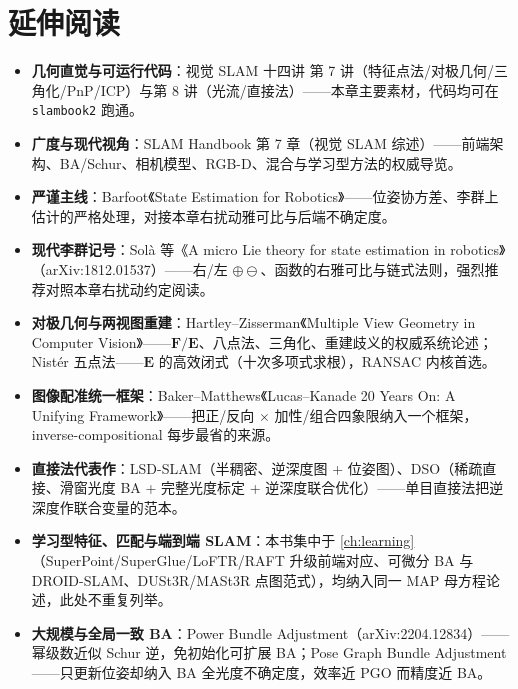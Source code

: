 \section*{延伸阅读}
\begin{itemize}
  \item \textbf{几何直觉与可运行代码}：视觉 SLAM 十四讲\cite{gaoxiang2019slam14} 第 7 讲（特征点法/对极几何/三角化/PnP/ICP）与第 8 讲（光流/直接法）——本章主要素材，代码均可在 \texttt{slambook2} 跑通。
  \item \textbf{广度与现代视角}：SLAM Handbook\cite{carlone2026handbook} 第 7 章（视觉 SLAM 综述）——前端架构、BA/Schur、相机模型、RGB-D、混合与学习型方法的权威导览。
  \item \textbf{严谨主线}：Barfoot《State Estimation for Robotics》\cite{barfoot2024state}——位姿协方差、李群上估计的严格处理，对接本章右扰动雅可比与后端不确定度。
  \item \textbf{现代李群记号}：Solà 等《A micro Lie theory for state estimation in robotics》\cite{sola2018micro}（arXiv:1812.01537）——右/左 $\oplus\ominus$、函数的右雅可比与链式法则，强烈推荐对照本章右扰动约定阅读。
  \item \textbf{对极几何与两视图重建}：Hartley--Zisserman《Multiple View Geometry in Computer Vision》\cite{hartley2004multiview}——$\mathbf{F}/\mathbf{E}$、八点法、三角化、重建歧义的权威系统论述；Nistér 五点法\cite{nister2004fivepoint}——$\mathbf{E}$ 的高效闭式（十次多项式求根），RANSAC 内核首选。
  \item \textbf{图像配准统一框架}：Baker--Matthews《Lucas--Kanade 20 Years On: A Unifying Framework》\cite{baker2004lk}——把正/反向 $\times$ 加性/组合四象限纳入一个框架，inverse-compositional 每步最省的来源。
  \item \textbf{直接法代表作}：LSD-SLAM\cite{engel2014lsd}（半稠密、逆深度图 + 位姿图）、DSO\cite{engel2017dso}（稀疏直接、滑窗光度 BA + 完整光度标定 + 逆深度联合优化）——单目直接法把逆深度作联合变量的范本。
  \item \textbf{学习型特征、匹配与端到端 SLAM}：本书集中于 \cref{ch:learning}（SuperPoint/SuperGlue/LoFTR/RAFT 升级前端对应、可微分 BA 与 DROID-SLAM、DUSt3R/MASt3R 点图范式），均纳入同一 MAP 母方程论述，此处不重复列举。
  \item \textbf{大规模与全局一致 BA}：Power Bundle Adjustment\cite{weber2023powerba}（arXiv:2204.12834）——幂级数近似 Schur 逆，免初始化可扩展 BA；Pose Graph Bundle Adjustment\cite{carlone2026handbook}——只更新位姿却纳入 BA 全光度不确定度，效率近 PGO 而精度近 BA。
\end{itemize}

